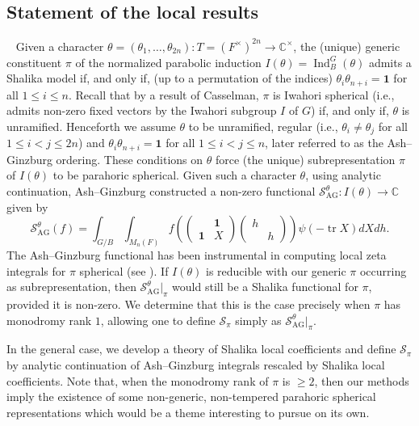 \documentclass{amsart}
\theoremstyle{definition}
\newcommand{\tr}{\operatorname{tr}}
\newcommand{\Ind}{\operatorname{Ind}}
\newcommand{\AG}{\operatorname{AG}}
\begin{document}
{\subsection{Statement of the local results} \label{sec:local}
Given a character $\theta=(\theta_1,\dots,\theta_{2n}) : T=(F^\times)^{2n}\to \mathbb{C}^\times$, the (unique) generic constituent $\pi$   
of  the normalized parabolic induction $I(\theta)=\Ind_B^G (\theta)$ admits a Shalika model if, and only if, (up to a permutation of the indices)
$\theta_i\theta_{n+i}=\mathbf{1}$ for all $1\leqslant i\leqslant n$. Recall that by  a result of Casselman, $\pi$ is Iwahori spherical (i.e.,  admits non-zero fixed vectors by the Iwahori subgroup $I$ of $G$) if, and only if,  $\theta$ is unramified. 
Henceforth we assume $\theta$ to be unramified, regular (i.e., $\theta_i\neq\theta_j$ for all  $1\leqslant i<j \leqslant 2n$)  and 
$\theta_i\theta_{n+i}=\mathbf{1}$ for all  $1\leqslant i<j \leqslant n$, later referred to as the Ash--Ginzburg ordering. 
 These conditions on $\theta$ force  (the unique) subrepresentation $\pi$ of $I(\theta)$ to be parahoric spherical. 
Given such a character $\theta$, using analytic continuation,  Ash--Ginzburg \cite{AG}  constructed a non-zero functional 
$\mathcal{S}^\theta_{\AG}:I(\theta)\to \mathbb{C}$ given by
\[\mathcal{S}^\theta_{\AG}(f)=\int_{G/B}\int_{M_n(F)}f
\left(\begin{pmatrix}
  & \mathbf{1}\\  \mathbf{1} & X\end{pmatrix}\begin{pmatrix}
h&\\&h\end{pmatrix}\right)\psi(-\tr X)dXdh.\]
 The  Ash--Ginzburg functional has been instrumental in computing local zeta integrals
for $\pi$ spherical (see \cite{AG,DJR,BDW,BDGJW}). If $I(\theta)$ is reducible with our generic $\pi$ occurring as 
 subrepresentation, then $\mathcal{S}^\theta_{\AG}|_\pi$ would still be  a Shalika functional  for $\pi$, provided it is non-zero. 
 We determine that this is the case precisely when $\pi$ has monodromy rank  $1$, allowing one to define $\mathcal{S}_\pi$
 simply as $\mathcal{S}^\theta_{\AG}|_\pi$. 
 
In the general case, we develop a theory of Shalika local coefficients and  define $\mathcal{S}_\pi$ by analytic continuation of Ash--Ginzburg integrals rescaled by Shalika local coefficients. Note that, when the monodromy rank of $\pi$ is $\geqslant 2$, then our methods imply the  existence of some non-generic, non-tempered 
parahoric spherical representations which would be a theme interesting to pursue on its own.  
 

}
\end{document}
